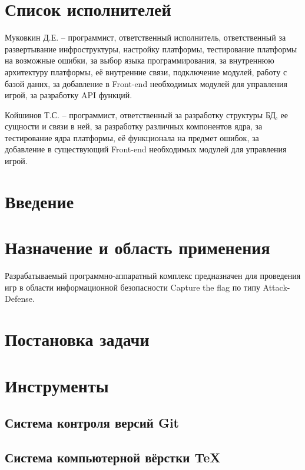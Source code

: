


 
 
 
 \newpage
 \section*{Список исполнителей}
 
Муковкин Д.Е. -- программист, ответственный исполнитель, ответственный за развертывание инфроструктуры, настройку платформы, тестирование платформы на возможные ошибки, за выбор языка программирования, за внутреннюю архитектуру платформы, её внутренние связи, подключение модулей, работу с базой даннх, за добавление в Front-end необходимых модулей для управления игрой, за разработку API функций.

Койшинов Т.С. -- программист, ответственный за разработку структуры БД, ее сущности и связи в ней, за разработку различных компонентов ядра, за тестирование ядра платформы, её функционала на предмет ошибок, за добавление в существующий Front-end необходимых модулей для управления игрой.
 
 \newpage
 \tableofcontents

 \newpage
 \section*{Введение}
 

 \section{Назначение и область применения}
Разрабатываемый программно-аппаратный комплекс предназначен для проведения игр в области информационной безопасности Capture the flag по типу Attack-Defense.
\section{Постановка задачи}
\setcounter{figure}{0}

\section{Инструменты}
\setcounter{figure}{0}
\subsection{Система контроля версий Git}

\subsection{Система компьютерной вёрстки \TeX}

